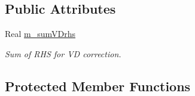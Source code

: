 \subsection*{Public Attributes}
\begin{DoxyCompactItemize}
\item 
\hypertarget{class_c_c_projector_ac7b91d7b25f49df0318a71ee0dd7f4e6}{Real \hyperlink{class_c_c_projector_ac7b91d7b25f49df0318a71ee0dd7f4e6}{m\-\_\-sum\-V\-Drhs}}\label{class_c_c_projector_ac7b91d7b25f49df0318a71ee0dd7f4e6}

\begin{DoxyCompactList}\small\item\em Sum of R\-H\-S for V\-D correction. \end{DoxyCompactList}\end{DoxyCompactItemize}
\subsection*{Protected Member Functions}
